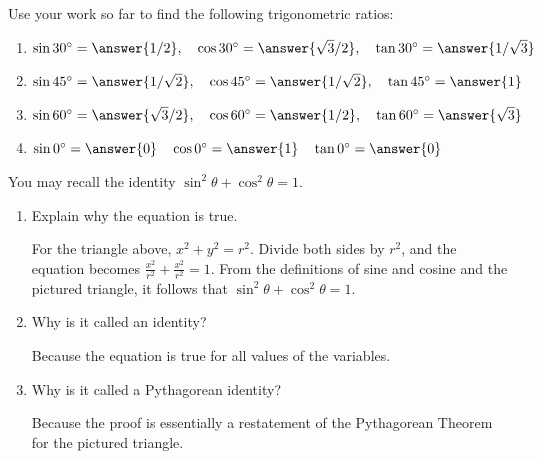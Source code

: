 \documentclass[nooutcomes]{ximera}
\begin{document}
\begin{problem}
Use your work so far to find the following trigonometric ratios:
\begin{enumerate}
\item $\sin 30^\circ = \answer{1/2}, \quad \cos30^\circ = \answer{\sqrt{3}/2}, \quad \tan30^\circ = \answer{1/\sqrt{3}}$
\item $\sin 45^\circ = \answer{1/\sqrt{2}}, \quad \cos45^\circ = \answer{1/\sqrt{2}}, \quad \tan45^\circ = \answer{1}$
\item $\sin 60^\circ = \answer{\sqrt{3}/2}, \quad \cos60^\circ = \answer{1/2}, \quad \tan60^\circ = \answer{\sqrt{3}}$
\item $\sin 0^\circ = \answer{0} \quad \cos0^\circ = \answer{1} \quad \tan0^\circ = \answer{0}$
\end{enumerate}
\end{problem}


\begin{problem}
You may recall the identity $\sin^2\theta+\cos^2\theta=1$.  
\begin{enumerate}
\item Explain why the equation is true.  \begin{hint}For the triangle above, $x^2 + y^2 = r^2$.  Divide both sides by $r^2$, and the equation becomes $\frac{x^2}{r^2} + \frac{x^2}{r^2} = 1$.  From the definitions of sine and cosine and the pictured triangle, it follows that $\sin^2\theta+\cos^2\theta=1$.\end{hint}
\item Why is it called an identity?  \begin{hint}Because the equation is true for all values of the variables.\end{hint}
\item Why is it called a Pythagorean identity?  \begin{hint}Because the proof is essentially a restatement of the Pythagorean Theorem for the pictured triangle.\end{hint}
\end{enumerate}
\begin{freeResponse}
\end{freeResponse}
\end{problem}
\end{document}
